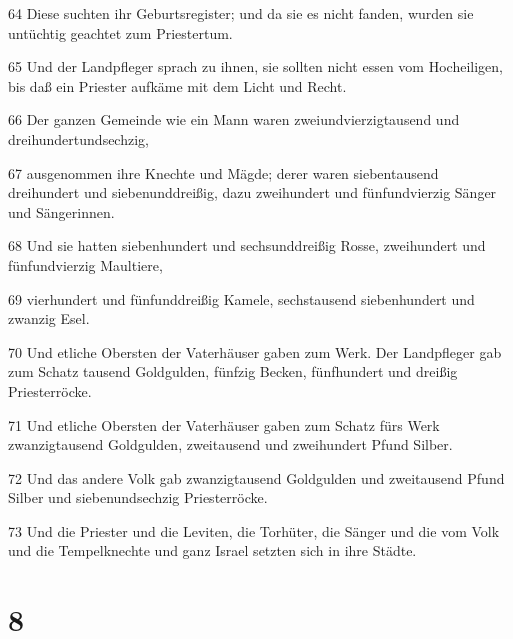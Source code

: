 \par 64 Diese suchten ihr Geburtsregister; und da sie es nicht fanden, wurden sie untüchtig geachtet zum Priestertum.
\par 65 Und der Landpfleger sprach zu ihnen, sie sollten nicht essen vom Hocheiligen, bis daß ein Priester aufkäme mit dem Licht und Recht.
\par 66 Der ganzen Gemeinde wie ein Mann waren zweiundvierzigtausend und dreihundertundsechzig,
\par 67 ausgenommen ihre Knechte und Mägde; derer waren siebentausend dreihundert und siebenunddreißig, dazu zweihundert und fünfundvierzig Sänger und Sängerinnen.
\par 68 Und sie hatten siebenhundert und sechsunddreißig Rosse, zweihundert und fünfundvierzig Maultiere,
\par 69 vierhundert und fünfunddreißig Kamele, sechstausend siebenhundert und zwanzig Esel.
\par 70 Und etliche Obersten der Vaterhäuser gaben zum Werk. Der Landpfleger gab zum Schatz tausend Goldgulden, fünfzig Becken, fünfhundert und dreißig Priesterröcke.
\par 71 Und etliche Obersten der Vaterhäuser gaben zum Schatz fürs Werk zwanzigtausend Goldgulden, zweitausend und zweihundert Pfund Silber.
\par 72 Und das andere Volk gab zwanzigtausend Goldgulden und zweitausend Pfund Silber und siebenundsechzig Priesterröcke.
\par 73 Und die Priester und die Leviten, die Torhüter, die Sänger und die vom Volk und die Tempelknechte und ganz Israel setzten sich in ihre Städte.

\chapter{8}

